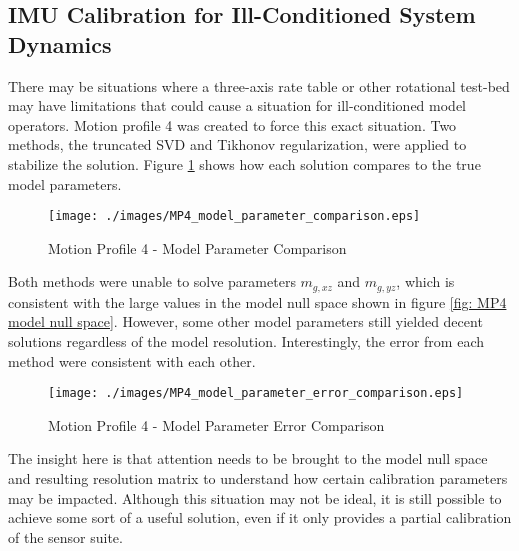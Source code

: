 \subsection{IMU Calibration for Ill-Conditioned System Dynamics}

There may be situations where a three-axis rate table or other rotational test-bed may have limitations that could cause a situation for ill-conditioned model operators. Motion profile 4 was created to force this exact situation. Two methods, the truncated SVD and Tikhonov regularization, were applied to stabilize the solution. Figure \ref{fig: MP4 model parameter comparison} shows how each solution compares to the true model parameters.

\begin{figure}[h] 
	\centering
	\texttt{[image: ./images/MP4\_model\_parameter\_comparison.eps]}
	\caption{Motion Profile 4 - Model Parameter Comparison}
	\label{fig: MP4 model parameter comparison}
\end{figure}
\FloatBarrier

Both methods were unable to solve parameters $m_{g,xz}$ and $m_{g,yz}$, which is consistent with the large values in the model null space shown in figure \ref{fig: MP4 model null space}. However, some other model parameters still yielded decent solutions regardless of the model resolution. Interestingly, the error from each method were consistent with each other. 

\begin{figure}[h] 
	\centering
	\texttt{[image: ./images/MP4\_model\_parameter\_error\_comparison.eps]}
	\caption{Motion Profile 4 - Model Parameter Error Comparison}
	\label{fig: MP4 model parameter error comparison}
\end{figure}
\FloatBarrier

The insight here is that attention needs to be brought to the model null space and resulting resolution matrix to understand how certain calibration parameters may be impacted. Although this situation may not be ideal, it is still possible to achieve some sort of a useful solution, even if it only provides a partial calibration of the sensor suite. 

